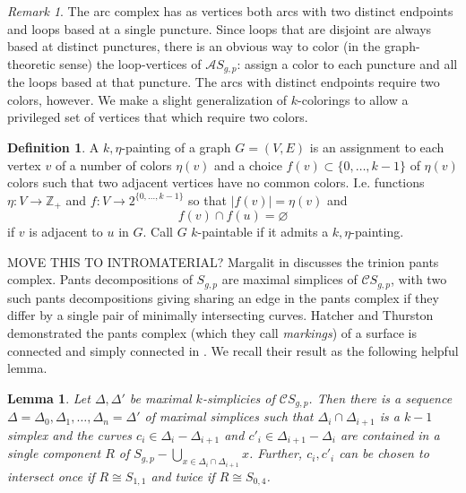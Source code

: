 \documentclass[11pt]{article}
\newcommand{\Z}{\mathbb{Z}}
\newtheorem{lemma}[theorem]{Lemma}
\theoremstyle{remark}
\newtheorem{remark}[theorem]{Remark}
\theoremstyle{definition}
\newtheorem{definition}[theorem]{Definition}
\begin{document}
\begin{remark}
  The arc complex has as vertices
  both arcs with two distinct
  endpoints and loops based at a single puncture.
  Since loops that are disjoint are always
  based at distinct punctures,
  there is an obvious way to color (in the graph-theoretic sense)
  the loop-vertices of
  $\mathcal A S_{g,p}$:
  assign a color to each puncture and all the loops based at that puncture.
  The arcs with distinct endpoints
  require two colors, however.
  We make a slight generalization of
  $k$-colorings to allow a privileged set of vertices that
  which require two colors.
\end{remark}

\begin{definition}
  A $k,\eta$-painting of a graph $G=(V,E)$
  is an assignment
  to each vertex $v$ of a number of colors $\eta(v)$
  and
  a choice $f(v) \subset \{0,\ldots,k-1\}$ of $\eta(v)$
  colors
  such that two adjacent vertices have no common colors.
  I.e. functions $\eta: V \to \Z_+$ and  $f: V \to 2^{\{0,\ldots,k-1\}}$
  so that $|f(v)| = \eta(v)$
  and
  $$f(v) \cap f(u) = \varnothing$$
  if $v$ is adjacent to $u$ in $G$.
  Call $G$ $k$-paintable if it admits a $k,\eta$-painting.
\end{definition}


MOVE THIS TO INTROMATERIAL?
Margalit in \cite{MR2040283} discusses the
trinion pants complex.
Pants decompositions of $S_{g,p}$ are maximal simplices of
$\mathcal C S_{g,p}$,
with two such pants decompositions giving sharing
an edge in the pants complex if they differ
by a single pair of minimally intersecting curves.
Hatcher and Thurston
demonstrated the
pants complex (which they call \emph{markings}) of a surface
is connected and simply connected
in \cite{MR579573}.
We recall their result as the following helpful lemma.

\begin{lemma}
  Let $\Delta,\Delta'$ be maximal $k$-simplicies of $\mathcal C S_{g,p}$.
  Then there is a sequence $\Delta = \Delta_0, \Delta_1, \ldots, \Delta_n=\Delta'$
  of maximal simplices such that
  $\Delta_i \cap \Delta_{i+1}$ is a $k-1$ simplex
  and the curves $c_i \in \Delta_i - \Delta_{i+1}$
  and $c'_i \in \Delta_{i+1} - \Delta_i$
  are contained in a single component $R$ of
  $S_{g,p} - \bigcup_{x \in \Delta_i \cap \Delta_{i+1}} x$.
  Further,
  $c_i,c'_i$ can be chosen to intersect once if $R \cong S_{1,1}$
  and twice if $R \cong S_{0,4}$.
  \label{lemma:pantspath}
\end{lemma}
\end{document}
